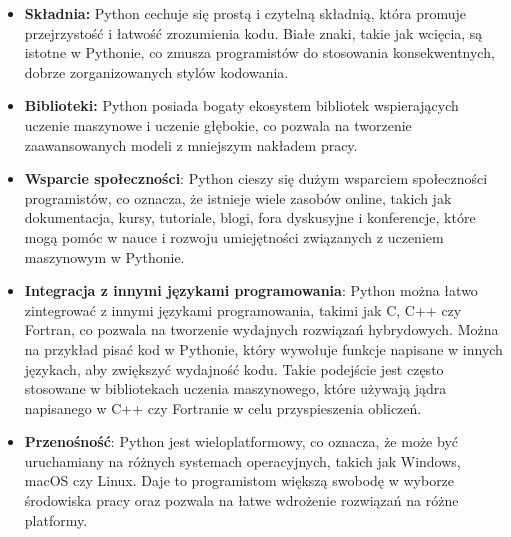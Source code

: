 \begin{itemize}
\item \textbf{Składnia:} Python cechuje się prostą i czytelną składnią, która promuje przejrzystość i łatwość zrozumienia kodu. Białe znaki, takie jak wcięcia, są istotne w Pythonie, co zmusza programistów do stosowania konsekwentnych, dobrze zorganizowanych stylów kodowania.

\item \textbf{Biblioteki:} Python posiada bogaty ekosystem bibliotek wspierających uczenie maszynowe i uczenie głębokie, co pozwala na tworzenie zaawansowanych modeli z mniejszym nakładem pracy.

\item \textbf{Wsparcie społeczności}: Python cieszy się dużym wsparciem społeczności programistów, co oznacza, że istnieje wiele zasobów online, takich jak dokumentacja, kursy, tutoriale, blogi, fora dyskusyjne i konferencje, które mogą pomóc w nauce i rozwoju umiejętności związanych z uczeniem maszynowym w Pythonie.

\item \textbf{Integracja z innymi językami programowania}: Python można łatwo zintegrować z innymi językami programowania, takimi jak C, C++ czy Fortran, co pozwala na tworzenie wydajnych rozwiązań hybrydowych. Można na przykład pisać kod w Pythonie, który wywołuje funkcje napisane w innych językach, aby zwiększyć wydajność kodu. Takie podejście jest często stosowane w bibliotekach uczenia maszynowego, które używają jądra napisanego w C++ czy Fortranie w celu przyspieszenia obliczeń.

\item \textbf{Przenośność}: Python jest wieloplatformowy, co oznacza, że może być uruchamiany na różnych systemach operacyjnych, takich jak Windows, macOS czy Linux. Daje to programistom większą swobodę w wyborze środowiska pracy oraz pozwala na łatwe wdrożenie rozwiązań na różne platformy.

\end{itemize}